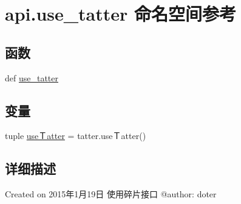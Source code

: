 \hypertarget{namespaceapi_1_1use__tatter}{\section{api.\-use\-\_\-tatter 命名空间参考}
\label{namespaceapi_1_1use__tatter}
}
\subsection*{函数}
\begin{DoxyCompactItemize}
\item 
def \hyperlink{namespaceapi_1_1use__tatter_acf16b0e75d3e2ecdd348bb9b873c275e}{use\-\_\-tatter}
\end{DoxyCompactItemize}
\subsection*{变量}
\begin{DoxyCompactItemize}
\item 
tuple \hyperlink{namespaceapi_1_1use__tatter_ab9ee11dd8b4e317186955b7daa18653d}{useＴatter} = tatter.\-useＴatter()
\end{DoxyCompactItemize}


\subsection{详细描述}
\begin{DoxyVerb}Created on 2015年1月19日
使用碎片接口
@author: doter
\end{DoxyVerb}
 

